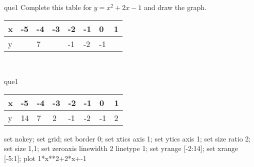 \documentclass[13.5pt, varwidth=true]{beamer}
\begin{document}
\begin{frame}[shrink=19,fragile]
	\begin{beamercolorbox}[rounded=true, left, shadow=true,wd=14.8cm]{que1}
		 Complete this table for $y = x^{2} + 2x - 1$ and draw the graph. \\[0.3cm] \renewcommand{\arraystretch}{1.2}\begin{tabular}{|C|C|C|C|C|C|C|C|} \hline x & -5 & -4 & -3 & -2 & -1 & 0 & 1 \\ \hline y &  & 7 &  & -1 & -2 & -1 & \\ \hline \end{tabular}\\[0.3cm]
	\end{beamercolorbox}
\end{frame}
\begin{frame}[shrink=19,fragile]
	\begin{beamercolorbox}[rounded=true, left, shadow=true,wd=14.8cm]{que1}
		\renewcommand{\arraystretch}{1.2}\begin{tabular}{|C|C|C|C|C|C|C|C|} \hline x & -5 & -4 & -3 & -2 & -1 & 0 & 1 \\ \hline y & 14 & 7 & 2 & -1 & -2 & -1 & 2\\ \hline \end{tabular}\begin{gnuplot}[terminal=pdf] set nokey; set grid; set border 0; set xtics axis 1; set ytics axis 1; set size ratio 2; set size 1,1; set zeroaxis linewidth 2 linetype 1; set yrange [-2:14]; set xrange [-5:1]; plot 1*x**2+2*x+-1 \end{gnuplot}
	\end{beamercolorbox}
\end{frame}
\end{document}
